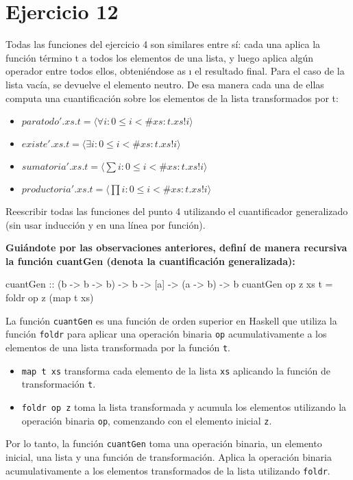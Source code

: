 \documentclass{article}
\begin{document}
\section*{Ejercicio 12}
Todas las funciones del ejercicio 4 son similares entre sí: cada una aplica la función término t a todos los elementos de una lista, y luego aplica algún operador entre todos ellos, obteniéndose as ı el resultado final. Para el caso de la lista vacía, se devuelve el elemento neutro. De esa manera cada una de ellas computa una cuantificación sobre los elementos de la lista transformados por t:
\begin{itemize}
\item 
$paratodo'.xs.t = \langle \forall i : 0 \leq i < \#xs : t.xs!i  \rangle $
\item 
$existe'.xs.t = \langle \exists i : 0 \leq i < \#xs : t.xs!i  \rangle $
\item 
$sumatoria'.xs.t = \langle \sum i : 0 \leq i < \#xs : t.xs!i \rangle $
\item 
$productoria'.xs.t = \langle \prod i : 0 \leq i < \#xs : t.xs!i  \rangle $
\end{itemize}
Reescribir todas las funciones del punto 4 utilizando el cuantificador generalizado (sin usar inducción y en una línea por función).

\textbf{Guiándote por las observaciones anteriores, definí de manera recursiva la función cuantGen (denota la cuantificación generalizada):}
\begin{haskell}
cuantGen :: (b -> b -> b) -> b -> [a] -> (a -> b) -> b
cuantGen op z xs t = foldr op z (map t xs)
\end{haskell}

La función \verb|cuantGen| es una función de orden superior en Haskell que utiliza la función \verb|foldr| para aplicar una operación binaria \verb|op| acumulativamente a los elementos de una lista transformada por la función \verb|t|.
\begin{itemize}
\item 
\verb|map t xs| transforma cada elemento de la lista \verb|xs| aplicando la función de transformación \verb|t|.
\item 
\verb|foldr op z| toma la lista transformada y acumula los elementos utilizando la operación binaria \verb|op|, comenzando con el elemento inicial \verb|z|.
\end{itemize}

Por lo tanto, la función \verb|cuantGen| toma una operación binaria, un elemento inicial, una lista y una función de transformación. Aplica la operación binaria acumulativamente a los elementos transformados de la lista utilizando \verb|foldr|.
\end{document}

